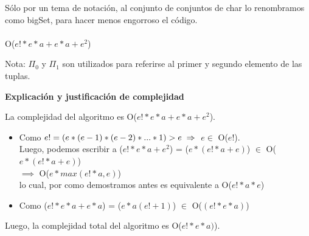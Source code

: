 \documentclass[11pt]{article}
\begin{document}
Sólo por un tema de notación, al conjunto de conjuntos de char lo renombramos como bigSet, para hacer menos 
engorroso el código.
\\ \\
\noindent\makebox[\linewidth]{\rule{17cm}{0.4pt}}
 {O($e!*e*a + e*a + e^2$)}

\vspace{1mm}
Nota: $\Pi_0$ y $\Pi_1$ son utilizados para referirse al primer y segundo elemento de las tuplas.

\vspace{3mm}
\begin{center}
\textbf{Explicación y justificación de complejidad} \\ 
\end{center} 

La complejidad del algoritmo es O($e!*e*a + e*a + e^{2}$).
\begin{itemize}
\item Como $e! = (e*(e-1)*(e-2)*...*1) > e \\ \implies $ $e \in$ O($e!$). \\ Luego, podemos escribir a 
  ($e!*e*a + e^2$) = ($e *(e!*a + e)$) $\in$ O($e *(e!*a + e)$) \\ $\implies$ O($e*max(e!*a, e)$) \\ lo cual, 
  por como demostramos antes es equivalente a O($e!*a*e$)
\item Como ($e!*e*a + e*a$) = ($e*a (e! + 1)$) $\in$ O($(e!*e*a)$)
\end{itemize}
Luego, la complejidad total del algoritmo es O($e!*e*a)$).
\end{document}
